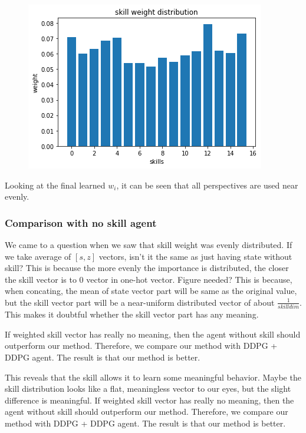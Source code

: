   \begin{figure}[ht]
    \vskip 0.2in
    \begin{center}
    \centerline{\includegraphics[width=\columnwidth]{Figures/skill_weight.png}}
    \caption{}
    \label{final_skill_weight}
    \end{center}
    \vskip -0.2in
    \end{figure}
Looking at the final learned ${w_i}$, it can be seen that all perspectives are used near evenly.

\subsubsection{Comparison with no skill agent}

We came to a question when we saw that skill weight was evenly distributed.
If we take average of ${[s,z]}$ vectors, isn't it the same as just having state without skill?
This is because the more evenly the importance is distributed, the closer the skill vector is to 0 vector in one-hot vector. Figure needed?
This is because, when concating, the mean of state vector part will be same as the original value,
but the skill vector part will be a near-uniform distributed vector of about $\frac{1}{skilldim}$.
This makes it doubtful whether the skill vector part has any meaning.

If weighted skill vector has really no meaning, then the agent without skill should outperform our method.
Therefore, we compare our method with DDPG + DDPG agent. The result is that our method is better.

This reveals that the skill allows it to learn some meaningful behavior.
Maybe the skill distribution looks like a flat, meaningless vector to our eyes, but the slight difference is meaningful.
If weighted skill vector has really no meaning, then the agent without skill should outperform our method.
Therefore, we compare our method with DDPG + DDPG agent. The result is that our method is better.

